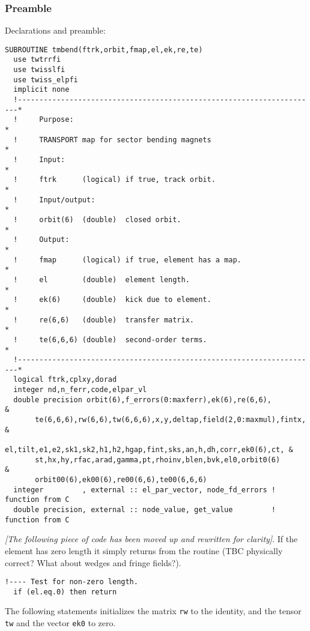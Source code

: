 \documentclass{cern-art} %
\renewcommand{\L}[1]{\lstinline[firstnumber=last]{#1}}
\begin{document}
\subsubsection{Preamble}
Declarations and preamble:
\begin{lstlisting}[firstnumber=auto]
SUBROUTINE tmbend(ftrk,orbit,fmap,el,ek,re,te)
  use twtrrfi
  use twisslfi
  use twiss_elpfi
  implicit none
  !----------------------------------------------------------------------*
  !     Purpose:                                                         *
  !     TRANSPORT map for sector bending magnets                         *
  !     Input:                                                           *
  !     ftrk      (logical) if true, track orbit.                        *
  !     Input/output:                                                    *
  !     orbit(6)  (double)  closed orbit.                                *
  !     Output:                                                          *
  !     fmap      (logical) if true, element has a map.                  *
  !     el        (double)  element length.                              *
  !     ek(6)     (double)  kick due to element.                         *
  !     re(6,6)   (double)  transfer matrix.                             *
  !     te(6,6,6) (double)  second-order terms.                          *
  !----------------------------------------------------------------------*
  logical ftrk,cplxy,dorad
  integer nd,n_ferr,code,elpar_vl
  double precision orbit(6),f_errors(0:maxferr),ek(6),re(6,6),           &
       te(6,6,6),rw(6,6),tw(6,6,6),x,y,deltap,field(2,0:maxmul),fintx,   &
       el,tilt,e1,e2,sk1,sk2,h1,h2,hgap,fint,sks,an,h,dh,corr,ek0(6),ct, &
       st,hx,hy,rfac,arad,gamma,pt,rhoinv,blen,bvk,el0,orbit0(6)         &
       orbit00(6),ek00(6),re00(6,6),te00(6,6,6)
  integer         , external :: el_par_vector, node_fd_errors ! function from C
  double precision, external :: node_value, get_value         ! function from C
\end{lstlisting}
{\em [The following piece of code has been moved up and rewritten for clarity]}. If the element has zero length it simply returns from the routine (TBC physically correct? What about wedges and fringe fields?).
\begin{lstlisting}[firstnumber=last]
  !---- Test for non-zero length.
  if (el.eq.0) then return
\end{lstlisting}
The following statements initializes the matrix \L{rw} to the identity, and the tensor \L{tw} and the vector \L{ek0} to zero.
\end{document}
